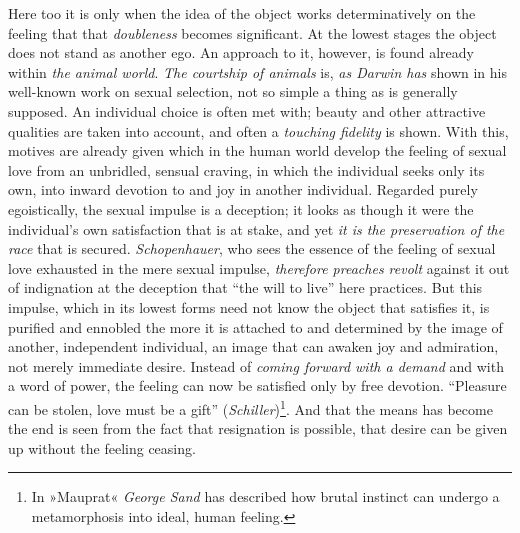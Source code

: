 \documentclass[12pt,a4paper]{book}
\newcommand{\opage}[1]{\marginnote{\footnotesize\textit{[#1]}}}
\begin{document}
Here too it is only when the idea of the object works determinatively
on the feeling that that \emph{doubleness} becomes significant. At the
lowest stages the object does not stand as another ego. An approach to
it, however, is found already within \emph{the animal world}. \emph{The
courtship of animals} is, \emph{as Darwin has} shown in his well-known
work on sexual selection, not so simple a thing as is generally
supposed. An individual choice is often met with; beauty and other
attractive qualities are taken into account, and often a \emph{touching
fidelity} is shown. With this, motives are already given which in the
human world develop the feeling of sexual love from an unbridled,
sensual craving, in which the individual seeks only its own, into
inward devotion to and joy in another individual. Regarded purely
egoistically, the sexual impulse is a deception; it looks as though it
were the individual's own satisfaction that is at stake, and yet \emph{it
is the preservation of the race} that is secured. \emph{Schopenhauer},
who sees the essence of the feeling of sexual love exhausted in the mere
sexual impulse, \emph{therefore preaches revolt} against it out of
indignation at the deception that ``the will to live'' here practices.
But this impulse, which in its lowest forms need not know the object
that satisfies it, is purified and ennobled the more it is attached to
and determined by the image of another, independent individual, an
image that can awaken joy and admiration, not merely immediate desire.
Instead of \emph{coming forward with a demand} and with a word of power,
\opage{302}the feeling can now be satisfied only by free devotion.
``Pleasure can be stolen, love must be a gift''
(\emph{Schiller})\footnote{In »Mauprat« \emph{George Sand} has
described how brutal instinct can undergo a metamorphosis into ideal,
human feeling.}. And that the means has become the end is seen from the
fact that resignation is possible, that desire can be given up without
the feeling ceasing.
\end{document}
